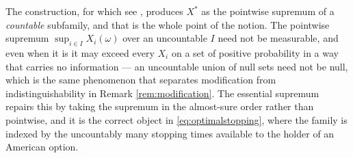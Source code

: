 The construction, for which see \cite[Appendix A]{karatzasshreve1991}, produces $X^*$ as the
pointwise supremum of a \emph{countable} subfamily, and that is the whole point of the notion. The
pointwise supremum $\sup_{i \in I} X_i(\omega)$ over an uncountable $I$ need not be measurable, and
even when it is it may exceed every $X_i$ on a set of positive probability in a way that carries no
information --- an uncountable union of null sets need not be null, which is the same phenomenon
that separates modification from indistinguishability in Remark \ref{rem:modification}. The
essential supremum repairs this by taking the supremum in the almost-sure order rather than
pointwise, and it is the correct object in \eqref{eq:optimalstopping}, where the family is indexed
by the uncountably many stopping times available to the holder of an American option.
